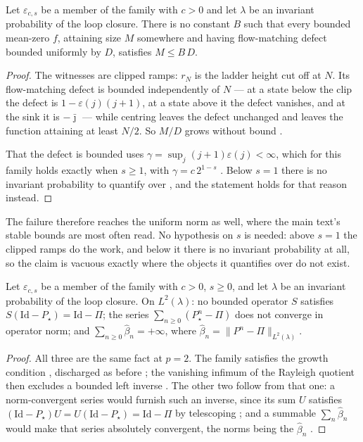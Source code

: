 \begin{theorem}
  \label{thm:main_unbounded_infty}
Let $\varepsilon_{c,s}$ be a member of the family with $c>0$ and let $\lambda$ be an invariant
probability of the loop closure. There is no constant $B$ such that every bounded mean-zero
$f$, attaining size $M$ somewhere and having flow-matching defect bounded uniformly by $D$,
satisfies $M\leq B\,D$.
\end{theorem}

\begin{proof}
The witnesses are clipped ramps: $r_N$ is the ladder height cut off at $N$. Its
flow-matching defect is bounded independently of $N$ — at a state below the clip the defect is
$1-\varepsilon(j)(j+1)$, at a state above it the defect vanishes, and at the sink it is
$-\bar\jmath$ — while centring leaves the defect unchanged and leaves the function attaining at
least $N/2$. So $M/D$ grows without bound
.

That the defect is bounded uses $\gamma=\sup_j(j+1)\varepsilon(j)<\infty$, which for this
family holds exactly when $s\geq1$, with $\gamma=c\,2^{1-s}$
. Below $s=1$ there is no invariant probability to quantify
over , and the statement holds for that
reason instead.
\end{proof}

\noindent The failure therefore reaches the uniform norm as well, where the main text's stable bounds are
most often read. No hypothesis on $s$ is needed: above $s=1$ the clipped ramps do the work, and
below it there is no invariant probability at all, so the claim is vacuous exactly where the
objects it quantifies over do not exist.


\begin{theorem}
  \label{thm:main_unbounded_two}
Let $\varepsilon_{c,s}$ be a member of the family with $c>0$, $s\geq0$, and let $\lambda$ be an
invariant probability of the loop closure. On $L^2(\lambda)$: no bounded operator $S$ satisfies
$S(\mathrm{Id}-P_\star)=\mathrm{Id}-\Pi$; the series $\sum_{n\geq0}(P_\star^n-\Pi)$ does not
converge in operator norm; and $\sum_{n\geq0}\widehat\beta_n=+\infty$, where
$\widehat\beta_n=\|P^n-\Pi\|_{L^2(\lambda)}$.
\end{theorem}

\begin{proof}
All three are the same fact at $p=2$. The family satisfies the growth condition
, discharged as before
; the vanishing infimum of the Rayleigh quotient
then excludes a bounded left inverse . The other two
follow from that one: a norm-convergent series would furnish such an inverse, since its sum
$U$ satisfies $(\mathrm{Id}-P_\star)U=U(\mathrm{Id}-P_\star)=\mathrm{Id}-\Pi$ by telescoping
; and a summable
$\sum_n\widehat\beta_n$ would make that series absolutely convergent, the norms being the
$\widehat\beta_n$ .
\end{proof}

